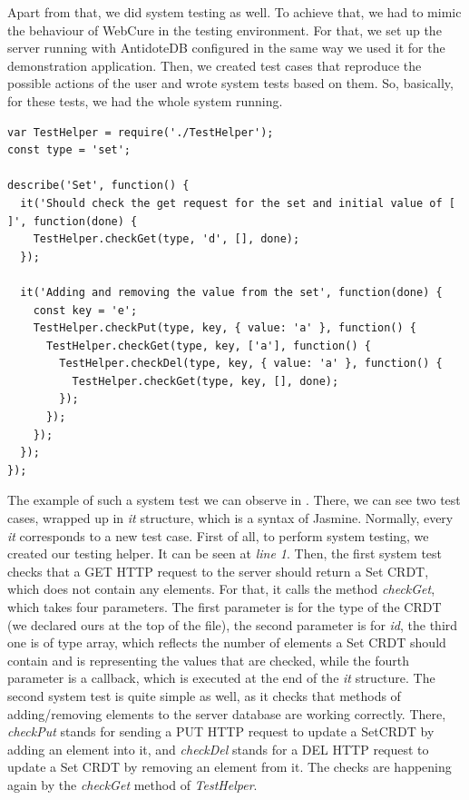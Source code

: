 Apart from that, we did system testing as well. To achieve that, we had to mimic the behaviour of WebCure in the testing environment. For that, we set up the server running with AntidoteDB configured in the same way we used it for the demonstration application. Then, we created test cases that reproduce the possible actions of the user and wrote system tests based on them. So, basically, for these tests, we had the whole system running. 

\begin{lstlisting}[caption={[System test example for WebCure] Simple system test that checks different actions performed on \textit{SetCRDT}.}, label={lst:ev2}]
var TestHelper = require('./TestHelper');
const type = 'set';

describe('Set', function() {
  it('Should check the get request for the set and initial value of [ ]', function(done) {
    TestHelper.checkGet(type, 'd', [], done);
  });

  it('Adding and removing the value from the set', function(done) {
    const key = 'e';
    TestHelper.checkPut(type, key, { value: 'a' }, function() {
      TestHelper.checkGet(type, key, ['a'], function() {
        TestHelper.checkDel(type, key, { value: 'a' }, function() {
          TestHelper.checkGet(type, key, [], done);
        });
      });
    });
  });
});
\end{lstlisting}

The example of such a system test we can observe in . There, we can see two test cases, wrapped up in \textit{it} structure, which is a syntax of Jasmine. Normally, every \textit{it} corresponds to a new test case. First of all, to perform system testing, we created our testing helper. It can be seen at \textit{line 1}. Then, the first system test checks that a GET HTTP request to the server should return a Set CRDT, which does not contain any elements. For that, it calls the method \textit{checkGet}, which takes four parameters. The first parameter is for the type of the CRDT (we declared ours at the top of the file), the second parameter is for \textit{id}, the third one is of type array, which reflects the number of elements a Set CRDT should contain and is representing the values that are checked, while the fourth parameter is a callback, which is executed at the end of the \textit{it} structure. The second system test is quite simple as well, as it checks that methods of adding/removing elements to the server database are working correctly. There, \textit{checkPut} stands for sending a PUT HTTP request to update a SetCRDT by adding an element into it, and \textit{checkDel} stands for a DEL HTTP request to update a Set CRDT by removing an element from it. The checks are happening again by the \textit{checkGet} method of \textit{TestHelper}.

